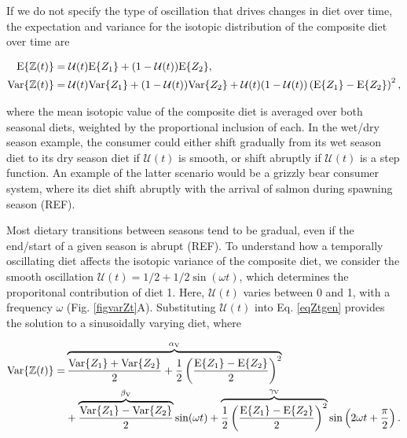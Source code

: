 \documentclass{frontiersSCNS}
\begin{document}

If we do not specify the type of oscillation that drives changes in diet over time, the expectation and variance for the isotopic distribution of the composite diet over time are

\begin{align}
  \label{eqZtgen}
  \begin{split}
    {\rm E}\{\mathbb{Z}(t)\} &= \mathcal{U}(t){\rm E}\{Z_1\} + (1-\mathcal{U}(t)){\rm E}\{Z_2\}, \\
    {\rm Var}\{\mathbb{Z}(t)\} &= \mathcal{U}(t){\rm Var}\{Z_1\} + (1-\mathcal{U}(t)){\rm Var}\{Z_2\} + \mathcal{U}(t)(1-\mathcal{U}(t))\left({\rm E}\{Z_1\} - {\rm E}\{Z_2\}\right)^2,
  \end{split}
\end{align}

\noindent where the mean isotopic value of the composite diet is averaged over both seasonal diets, weighted by the proportional inclusion of each.
In the wet/dry season example, the consumer could either shift gradually from its wet season diet to its dry season diet if $\mathcal{U}(t)$ is smooth, or shift abruptly if $\mathcal{U}(t)$ is a step function.
An example of the latter scenario would be a grizzly bear consumer system, where its diet shift abruptly with the arrival of salmon during spawning season (REF).

Most dietary transitions between seasons tend to be gradual, even if the end/start of a given season is abrupt (REF).
To understand how a temporally oscillating diet affects the isotopic variance of the composite diet, we consider the smooth oscillation $\mathcal{U}(t) = 1/2 + 1/2\sin(\omega t)$, which determines the proporitonal contribution of diet 1.
Here, $\mathcal{U}(t)$ varies between 0 and 1, with a frequency $\omega$ (Fig. \ref{figvarZt}A).
Substituting $\mathcal{U}(t)$ into Eq. \ref{eqZtgen} provides the solution to a sinusoidally varying diet, where

\begin{align}
  \begin{split}
  \label{eqZtsin}
    {\rm Var}\{\mathbb{Z}(t)\} = &\overbrace{\frac{{\rm Var}\{Z_1\} + {\rm Var}\{Z_2\}}{2} + \frac{1}{2} \left(\frac{{\rm E}\{Z_1\} - {\rm E}\{Z_2\}}{2}\right)^2}^{\alpha_{\rm V}} \\
    &+ \overbrace{\frac{{\rm Var}\{Z_1\} - {\rm Var}\{Z_2\}}{2}}^{\beta_{\rm V}}\sin(\omega t) + \overbrace{\frac{1}{2}\left(\frac{{\rm E}\{Z_1\} - {\rm E}\{Z_2\}}{2}\right)^2}^{\gamma_{\rm V}}\sin\left(2\omega t + \frac{\pi}{2}\right).
  \end{split}
\end{align}
\end{document}

